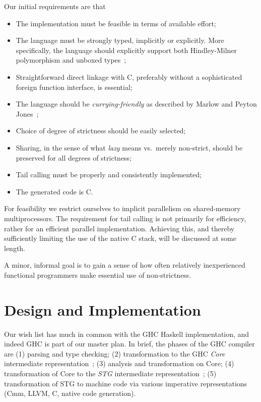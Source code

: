 \documentclass{llncs}
\begin{document}
Our initial requirements are that
%
\begin{itemize}
\item The implementation must be feasible in terms of available effort;
\item The language must be strongly typed, implicitly or explicitly.  More
  specifically, the language should explicitly support both Hindley-Milner
  polymorphism and unboxed types~\cite{Jones:1991};
\item Straightforward direct linkage with C, preferably without a sophisticated
  foreign function interface, is essential;
  \item The language should be \emph{currying-friendly} as described by Marlow
and Peyton Jones~\cite{Marlow:2004};
\item Choice of degree of strictness should be easily selected;
\item Sharing, in the sense of what \emph{lazy} means vs.\ merely non-strict,
  should be preserved for all degrees of strictness;
\item Tail calling must be properly and consistently implemented;
\item The generated code is C.
\end{itemize}
%
For feasibility we restrict ourselves to implicit parallelism on shared-memory
multiprocessors.  The requirement for tail calling is not primarily for
efficiency, rather for an efficient parallel implementation.  Achieving
this, and thereby sufficiently limiting the use of the native C stack, will be
discussed at some length.

A minor, informal goal is to gain a sense of how often relatively
inexperienced functional programmers make essential use of
non-strictness.%

\section{Design and Implementation}
Our wish list has much in common with the GHC Haskell implementation, and
indeed GHC is part of our master plan.  In brief, the phases of the GHC
compiler are (1) parsing and type checking; (2) transformation to the GHC
\emph{Core} intermediate representation~\cite{Sulzmann:2007,ghc-core}; (3)
analysis and transformation on Core; (4) transformation of Core to the
\emph{STG} intermediate representation~\cite{PJ-stockhardware}; (5)
transformation of STG to machine code via various imperative
representations (Cmm, LLVM, C, native code generation).
\end{document}
